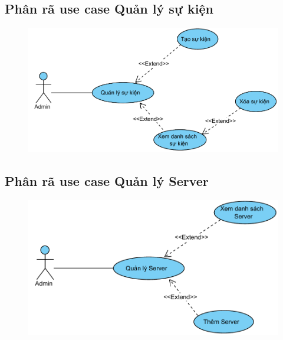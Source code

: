\documentclass[3p]{elsarticle}
\begin{document}
\subsection{Phân rã use case Quản lý sự kiện}
\begin{figure}[!htbp]
	\hspace*{-.5in}
	\centering
	\includegraphics[scale=.8]{images/usecases/admin_EventManagement.pdf}
\end{figure}
\newpage
\subsection{Phân rã use case Quản lý Server}
\begin{figure}[!htbp]
	\hspace*{-.5in}
	\centering
	\includegraphics[scale=.8]{images/usecases/admin_ServerManagement.pdf}
\end{figure}
\newpage
\end{document}
